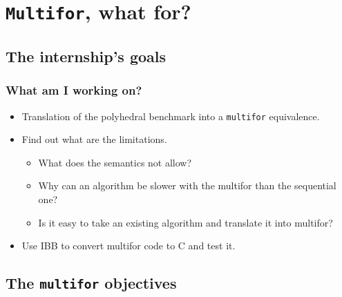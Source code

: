 \documentclass{beamer}
\begin{document}

\section{\texttt{Multifor}, what for?}

\subsection{The internship's goals}

\begin{frame}
\frametitle{What am I working on?}
\begin{itemize}

\item Translation of the polyhedral benchmark into a \texttt{multifor} equivalence.
\item Find out what are the limitations.

\begin{itemize}

\item What does the semantics not allow?
\item Why can an algorithm be slower with the multifor than the sequential one?
\item Is it easy to take an existing algorithm and translate it into multifor?

\end{itemize}

\item Use IBB to convert multifor code to C and test it.

\end{itemize}
\end{frame}

\subsection{The \texttt{multifor} objectives}
\end{document}
